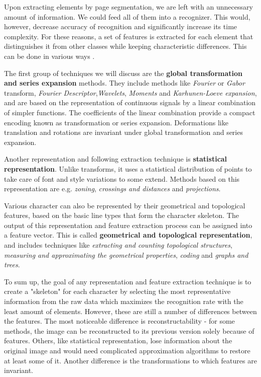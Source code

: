 Upon extracting elements by page segmentation, we are left with an unnecessary amount of information. We could feed all of them into a recognizer. This would, however, decrease accuracy of recognition and significantly increase its time complexity. For these reasons, a set of features is extracted for each element that distinguishes it from other classes while keeping characteristic differences. This can be done in various ways \citep{featureExtractionBook}.
\begin{description}

\item The first group of techniques we will discuss are the \textbf{global transformation and series expansion} methods. They include methods like \emph{Fourier} or \emph{Gabor} transform, \emph{Fourier Descriptor},\emph{Wavelets}, \emph{Moments} and \emph{Karhunen-Loeve expansion}, and are based on the representation of continuous signals by a linear combination of simpler functions. The coefficients of the linear combination provide a compact encoding known as transformation or series expansion. Deformations like translation and rotations are invariant under global transformation and series expansion.

\item Another representation and following extraction technique is \textbf{statistical representation}. Unlike transforms, it uses a statistical distribution of points to take care of font and style variations to some extend. Methods based on this representation are e.g. \emph{zoning}, \emph{crossings and distances} and \emph{projections}.

\item Various character can also be represented by their geometrical and topological features, based on the basic line types that form the character skeleton. The output of this representation and feature extraction process can be assigned into a feature vector.
This is called \textbf{geometrical and topological representation}, and includes techniques like \emph{extracting and counting topological structures}, \emph{measuring and approximating the geometrical properties}, \emph{coding} and \emph{graphs and trees}.

\end{description}

To sum up, the goal of any representation and feature extraction technique is to create a "skeleton" for each character by selecting the most representative information from the raw data which maximizes the recognition rate with the least amount of elements. However, these are still a number of differences between the features. The most noticeable difference is reconstructability - for some methods, the image can be reconstructed to its previous version solely because of features. Others, like statistical representation, lose information about the original image and would need complicated approximation algorithms to restore at least some of it. Another difference is the transformations to which features are invariant.

